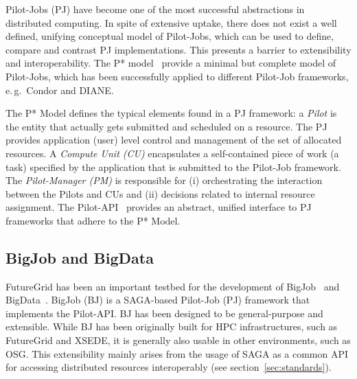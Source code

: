 \documentclass[]{paper}
\begin{document}
Pilot-Jobs (PJ) have become one of the most successful abstractions in
distributed computing. In spite of extensive uptake, there does not
exist a well defined, unifying conceptual model of Pilot-Jobs, which
can be used to define, compare and contrast PJ implementations. This
presents a barrier to extensibility and interoperability. The P*
model~\cite{pstar-2012,pstar-sc-2012} provide a minimal but complete
model of Pilot-Jobs, which has been successfully applied to different
Pilot-Job frameworks, e.\,g.\ Condor and DIANE.

The P* Model defines the typical elements found in a PJ framework: a
\emph{Pilot} is the entity that actually gets submitted and scheduled on a
resource. The PJ provides application (user) level control and management of
the set of allocated resources. A \emph{Compute Unit (CU)} encapsulates a
self-contained piece of work (a task) specified by the application that is
submitted to the Pilot-Job framework. The \emph{Pilot-Manager (PM)} is
responsible for (i) orchestrating the interaction between the Pilots and CUs
and (ii) decisions related to internal resource assignment. The 
Pilot-API~\cite{pilot_api} provides an abstract, unified interface to PJ
frameworks that adhere to the P* Model.



\subsection{BigJob and BigData}

FutureGrid has been an important testbed for the development of
BigJob~\cite{saga_bigjob_condor_cloud} and
BigData~\cite{pstar-sc-2012,pmr-2012}. BigJob (BJ) is a SAGA-based Pilot-Job
(PJ) framework that implements the Pilot-API. BJ has been designed to be
general-purpose and extensible. While BJ has been originally built for HPC
infrastructures, such as FutureGrid and XSEDE, it is generally also usable in
other environments, such as OSG. This extensibility mainly arises from the
usage of SAGA as a common API for accessing distributed resources
interoperably (see section~\ref{sec:standards}).
\end{document}
